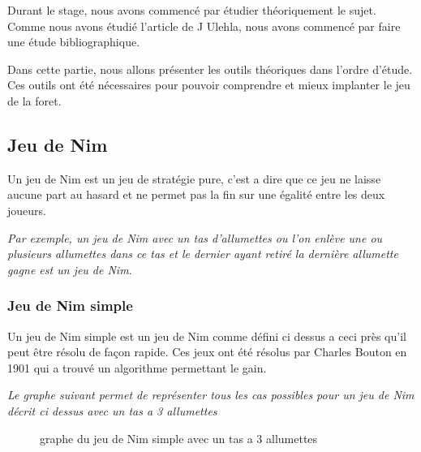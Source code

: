 Durant le stage, nous avons commencé par étudier théoriquement le sujet. Comme nous avons étudié l'article de J Ulehla, nous avons commencé par faire une étude bibliographique.

Dans cette partie, nous allons présenter les outils théoriques dans l'ordre d’étude. Ces outils ont été nécessaires pour pouvoir comprendre et mieux implanter le jeu de la foret.

\subsection{Jeu de Nim}
\label{sub:Jeu de Nim}
  Un jeu de  Nim est un jeu de stratégie pure, c'est a dire que ce jeu ne laisse aucune part au hasard et ne permet pas la fin sur une égalité entre les deux joueurs.

  \textit{
    Par exemple, un jeu de Nim avec un tas d'allumettes ou l'on enlève une ou plusieurs allumettes dans ce tas et le dernier ayant retiré la dernière allumette gagne est un jeu de Nim.
  }
  \subsubsection{Jeu de Nim simple}
  \label{subsub: Jeu de Nim simple}
    Un jeu de Nim simple est un jeu de Nim comme défini ci dessus a ceci près qu'il peut être résolu de façon rapide. Ces jeux ont été résolus par Charles Bouton en 1901\cite{jfji} qui a trouvé un algorithme permettant le gain.

    \textit{
      Le graphe suivant permet de représenter tous les cas possibles pour un jeu de Nim décrit ci dessus avec un tas a 3 allumettes
    }
    \begin{figure}[h]
      \centering
      \caption{graphe du jeu de Nim simple avec un tas a 3 allumettes}
    \end{figure}

